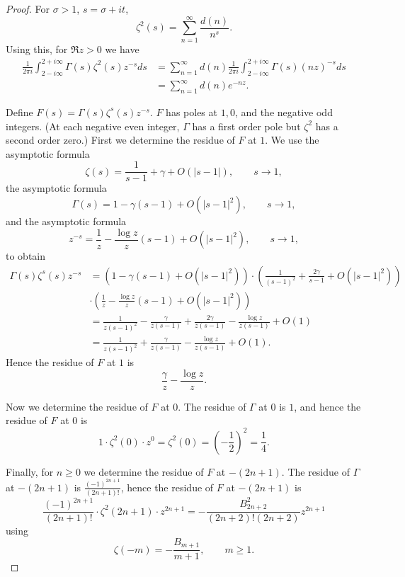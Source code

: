 \documentclass{article}
\theoremstyle{definition}
\begin{document}
\begin{proof}
For $\sigma>1$, $s=\sigma+it$,
\[
\zeta^2(s) = \sum_{n=1}^\infty \frac{d(n)}{n^s}.
\]
Using this, for
 $\Re z>0$ we have
\begin{align}
\frac{1}{2\pi i}\int_{2-i\infty}^{2+i\infty}
\Gamma(s) \zeta^2(s) z^{-s} ds & = \sum_{n=1}^\infty d(n) \frac{1}{2\pi i} \int_{2-i\infty}^{2+i\infty}
\Gamma(s) (nz)^{-s} ds
\nonumber \\
& = \sum_{n=1}^\infty d(n) e^{-nz}.
\label{mellin}
\end{align}

Define $F(s) = \Gamma(s) \zeta^s(s) z^{-s}$. $F$ has poles at
$1,0$, and the negative odd integers. (At each negative even integer, $\Gamma$ has a first order pole but $\zeta^2$ has a second order
zero.) First we determine the residue of $F$ at $1$.
We use the asymptotic formula
\[
\zeta(s) = \frac{1}{s-1}+\gamma+O(|s-1|), \qquad s \to 1,
\]
the asymptotic formula
\[
\Gamma(s)=1-\gamma(s-1)+O(|s-1|^2), \qquad s \to 1,
\]
and  the asymptotic formula
\[
z^{-s} = \frac{1}{z}-\frac{\log z}{z} (s-1)+O(|s-1|^2), \qquad  s \to 1,
\]
to obtain
\begin{align*}
 \Gamma(s) \zeta^s(s) z^{-s} &=(1-\gamma(s-1)+O(|s-1|^2)  )
\cdot \left(\frac{1}{(s-1)^2}+\frac{2\gamma}{s-1}+O(|s-1|^2)\right)\\
&\cdot \left( \frac{1}{z}-\frac{\log z}{z} (s-1)+O(|s-1|^2) \right)\\
&=\frac{1}{z(s-1)^2}
-\frac{\gamma}{z(s-1)}+\frac{2\gamma}{z(s-1)}-\frac{\log z}{z(s-1)}+O(1)\\
&=\frac{1}{z(s-1)^2}+\frac{\gamma}{z(s-1)}-\frac{\log z}{z(s-1)}+O(1).
\end{align*}
Hence the residue of $F$ at $1$ is 
\[
\frac{\gamma}{z}-\frac{\log z}{z}.
\]

Now we determine the residue of $F$ at $0$. The residue of $\Gamma$ at $0$ is $1$, and 
hence the residue of $F$ at $0$ is 
\[
1 \cdot \zeta^2(0) \cdot z^0 = \zeta^2(0) = \left( -\frac{1}{2} \right)^2 = \frac{1}{4}.
\]

Finally, for $n \geq 0$ we determine the residue of $F$ at $-(2n+1)$. The residue of $\Gamma$ at $-(2n+1)$ is
$\frac{(-1)^{2n+1}}{(2n+1)!}$, hence the residue of $F$ at $-(2n+1)$ is
\[
\frac{(-1)^{2n+1}}{(2n+1)!} \cdot \zeta^2(2n+1) \cdot z^{2n+1} = 
-\frac{B_{2n+2}^2}{(2n+2)!(2n+2)} z^{2n+1}
\]  
using 
\[
\zeta(-m) = -\frac{B_{m+1}}{m+1}, \qquad m \geq 1.
\]



\end{proof}
\end{document}
